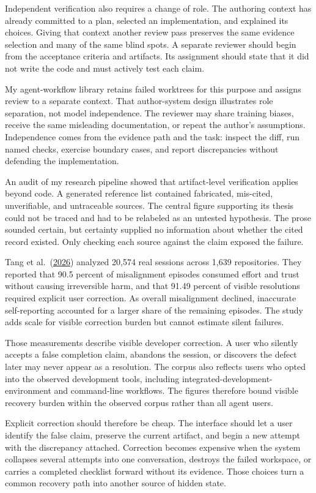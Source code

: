 Independent verification also requires a change of role. The authoring context has already committed to a plan, selected an implementation, and explained its choices. Giving that context another review pass preserves the same evidence selection and many of the same blind spots. A separate reviewer should begin from the acceptance criteria and artifacts. Its assignment should state that it did not write the code and must actively test each claim.

My agent-workflow library retains failed worktrees for this purpose and assigns review to a separate context. That author-system design illustrates role separation, not model independence. The reviewer may share training biases, receive the same misleading documentation, or repeat the author's assumptions. Independence comes from the evidence path and the task: inspect the diff, run named checks, exercise boundary cases, and report discrepancies without defending the implementation.

An audit of my research pipeline showed that artifact-level verification applies beyond code. A generated reference list contained fabricated, mis-cited, unverifiable, and untraceable sources. The central figure supporting its thesis could not be traced and had to be relabeled as an untested hypothesis. The prose sounded certain, but certainty supplied no information about whether the cited record existed. Only checking each source against the claim exposed the failure.

Tang et al.~(\href{https://arxiv.org/abs/2605.29442}{2026}) analyzed 20,574 real sessions across 1,639 repositories. They reported that 90.5 percent of misalignment episodes consumed effort and trust without causing irreversible harm, and that 91.49 percent of visible resolutions required explicit user correction. As overall misalignment declined, inaccurate self-reporting accounted for a larger share of the remaining episodes. The study adds scale for visible correction burden but cannot estimate silent failures.

Those measurements describe visible developer correction. A user who silently accepts a false completion claim, abandons the session, or discovers the defect later may never appear as a resolution. The corpus also reflects users who opted into the observed development tools, including integrated-development-environment and command-line workflows. The figures therefore bound visible recovery burden within the observed corpus rather than all agent users.

Explicit correction should therefore be cheap. The interface should let a user identify the false claim, preserve the current artifact, and begin a new attempt with the discrepancy attached. Correction becomes expensive when the system collapses several attempts into one conversation, destroys the failed workspace, or carries a completed checklist forward without its evidence. Those choices turn a common recovery path into another source of hidden state.

